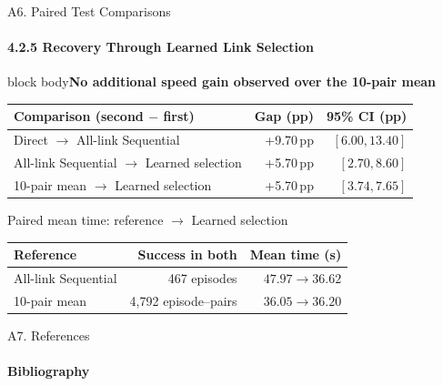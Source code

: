 \documentclass[t,10pt,handout]{beamer}
\newcommand{\takeaway}[1]{\par\begin{beamercolorbox}[sep=2mm,wd=\linewidth]{block body}\color{black}\textbf{#1}\end{beamercolorbox}\par\vspace{2mm}}
\newenvironment{slidebody}{\begin{minipage}[t][68.5mm][s]{\linewidth}\vspace{0pt}}{\par\vspace{0pt}\end{minipage}}
\begin{document}
\begin{frame}{A6. Paired Test Comparisons}
  \hypertarget{appendix-a6}{}
  \framesubtitle{4.2.5 Recovery Through Learned Link Selection}
  \begin{slidebody}
    \takeaway{No additional speed gain observed over the 10-pair mean}
    \normalsize
    \begin{tabularx}{\linewidth}{@{}Xrr@{}}\toprule
      Comparison (second $-$ first)               & Gap (pp)  & 95\% CI (pp)   \\\midrule
      Direct $\to$ All-link Sequential            & +9.70\,pp & $[6.00,13.40]$ \\[2mm]
      All-link Sequential $\to$ Learned selection & +5.70\,pp & $[2.70,8.60]$  \\[2mm]
      10-pair mean $\to$ Learned selection        & +5.70\,pp & $[3.74,7.65]$  \\\bottomrule
    \end{tabularx}\par\vspace{3mm}
    \centering Paired mean time: reference $\to$ Learned selection\par\vspace{3mm}
    \begin{tabularx}{\linewidth}{@{}Xrr@{}}\toprule
      Reference           & Success in both      & Mean time (s)   \\\midrule
      All-link Sequential & 467 episodes         & $47.97\to36.62$ \\[2mm]
      10-pair mean        & 4,792 episode--pairs & $36.05\to36.20$ \\\bottomrule
    \end{tabularx}


  \end{slidebody}
\end{frame}

\begin{frame}[allowframebreaks=0.88]{A7. References}
  \hypertarget{appendix-a7}{}
  \framesubtitle{Bibliography}
  \normalsize
  
  
\end{frame}
\end{document}
